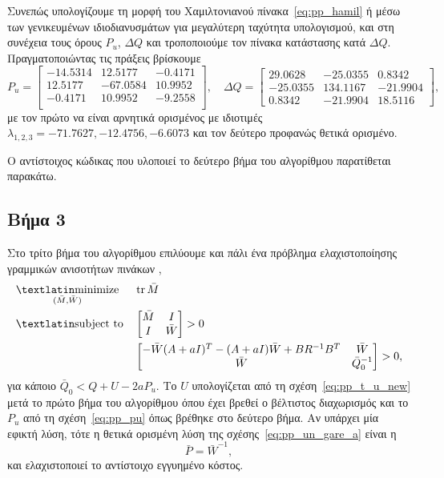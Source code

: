 Συνεπώς υπολογίζουμε τη μορφή  του Χαμιλτονιανού
πίνακα~\eqref{eq:pp_hamil} ή μέσω των γενικευμένων ιδιοδιανυσμάτων για
μεγαλύτερη ταχύτητα υπολογισμού, και στη συνέχεια τους όρους \( P_u \), \( \Delta
Q \) και τροποποιούμε τον πίνακα κατάστασης κατά \( \Delta Q \).
Πραγματοποιώντας τις πράξεις βρίσκουμε
\[
    P_u =
    \begin{bmatrix}
        -14.5314 & 12.5177 & -0.4171 \\
        12.5177 & -67.0584 & 10.9952 \\
        -0.4171 & 10.9952 & -9.2558 \\
    \end{bmatrix}, \quad
    \Delta Q =
    \begin{bmatrix}
        29.0628 & -25.0355 & 0.8342 \\
        -25.0355 & 134.1167 & -21.9904 \\
        0.8342 & -21.9904 & 18.5116
    \end{bmatrix},
\]
με τον πρώτο να είναι αρνητικά ορισμένος με ιδιοτιμές \( \lambda_{1, 2, 3} =
-71.7627, -12.4756, -6.6073 \) και τον δεύτερο προφανώς θετικά ορισμένο.

Ο αντίστοιχος κώδικας  που υλοποιεί το δεύτερο βήμα του αλγορίθμου
παρατίθεται παρακάτω.
\eng{}

\subsection{Βήμα 3}
Στο τρίτο βήμα του αλγορίθμου επιλύουμε και πάλι ένα πρόβλημα ελαχιστοποίησης
γραμμικών ανισοτήτων πινάκων ,
\begin{equation*}
    \begin{aligned}
        & \underset{
            (\bar{M}, \bar{W})
        }{\mathtxt{minimize}}
        & & \tr \bar{M} \\
        & \mathtxt{subject to}
        & &
        \begin{bmatrix}
            \bar{M} & I \\
            I & \bar{W}
        \end{bmatrix} > 0 \\
        &&&
        \begin{bmatrix}
            -\bar{W}(A + aI)^T - (A + aI)\bar{W} + BR^{-1}B^T
            & \bar{W} \\
            \bar{W} & \bar{Q}_0^{-1}\\
        \end{bmatrix} > 0,
    \end{aligned}
\end{equation*}
για κάποιο \( \bar{Q}_0 < Q + U - 2aP_u \). Το \( U \) υπολογίζεται από τη
σχέση~\eqref{eq:pp_t_u_new} μετά το πρώτο βήμα του αλγορίθμου όπου έχει βρεθεί
ο βέλτιστος διαχωρισμός και το \( P_u \) από τη σχέση~\eqref{eq:pp_pu} όπως
βρέθηκε στο δεύτερο βήμα. Αν υπάρχει μία εφικτή λύση, τότε η θετικά ορισμένη
λύση της σχέσης~\eqref{eq:pp_un_gare_a} είναι η
\[
    \bar{P} = \bar{W}^{-1},
\]
και ελαχιστοποιεί το αντίστοιχο εγγυημένο κόστος.

